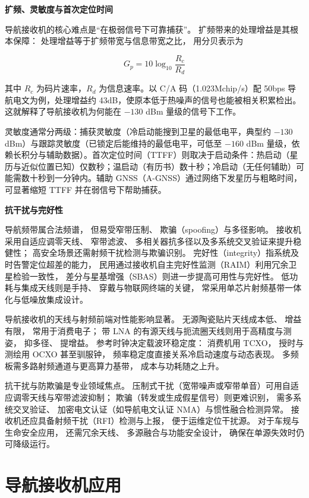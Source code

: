 \medskip\noindent\textbf{扩频、灵敏度与首次定位时间}

导航接收机的核心难点是“在极弱信号下可靠捕获”。
扩频带来的处理增益是其根本保障：
处理增益等于扩频带宽与信息带宽之比，
用分贝表示为

\[
G_p=10\log_{10}\frac{R_c}{R_d}
\]

其中 $R_c$ 为码片速率，$R_d$ 为信息速率。以 C/A 码（1.023Mchip/s）配 50bps 导航电文为例，处理增益约 43dB，使原本低于热噪声的信号也能被相关积累检出。这就解释了导航接收机为何能在 $-130$ dBm 量级的信号下工作。

灵敏度通常分两级：捕获灵敏度（冷启动能搜到卫星的最低电平，典型约 $-130$ dBm）与跟踪灵敏度（已锁定后能维持的最低电平，可低至 $-160$ dBm 量级，依赖长积分与辅助数据）。首次定位时间（TTFF）则取决于启动条件：热启动（星历与近似位置已知）仅数秒；温启动（有历书）数十秒；冷启动（无任何辅助）可能需数十秒到一分钟内。辅助 GNSS（A-GNSS）通过网络下发星历与粗略时间，可显著缩短 TTFF 并在弱信号下帮助捕获。

\medskip\noindent\textbf{抗干扰与完好性}

导航频带属合法频谱，
但易受窄带压制、
欺骗（spoofing）与多径影响。
接收机采用自适应调零天线、
窄带滤波、
多相关器抗多径以及多系统交叉验证来提升稳健性；
高安全场景还需射频干扰检测与欺骗识别。
完好性（integrity）指系统及时告警定位超差的能力，
民用通过接收机自主完好性监测（RAIM）利用冗余卫星检验一致性，
差分与星基增强（SBAS）则进一步提高可用性与完好性。
低功耗与集成天线则是手持、
穿戴与物联网终端的关键，
常采用单芯片射频基带一体化与低噪放集成设计。

导航接收机的天线与射频前端对性能影响显著。
无源陶瓷贴片天线成本低、
增益有限，
常用于消费电子；
带 LNA 的有源天线与扼流圈天线则用于高精度与测姿，
抑多径、
提增益。
参考时钟决定载波环稳定度：
消费机用 TCXO，
授时与测绘用 OCXO 甚至驯服钟，
频率稳定度直接关系冷启动速度与动态表现。
多频板需多路射频通道与更高算力基带，
成本与功耗随之上升。

抗干扰与防欺骗是专业领域焦点。
压制式干扰（宽带噪声或窄带单音）可用自适应调零天线与窄带滤波抑制；
欺骗（转发或生成假星信号）则更难识别，
需多系统交叉验证、
加密电文认证（如导航电文认证 NMA）与惯性融合检测异常。
接收机还应具备射频干扰（RFI）检测与上报，
便于运维定位干扰源。
对于车规与生命安全应用，
还需冗余天线、
多源融合与功能安全设计，
确保在单源失效时仍可降级运行。

\section{导航接收机应用}
\label{sec:nav_receiver_applications}

